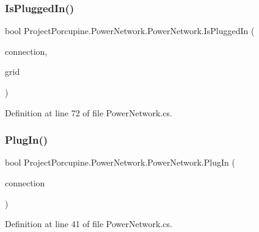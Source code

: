 \subsubsection{\texorpdfstring{Is\+Plugged\+In()}{IsPluggedIn()}}
{\footnotesize\ttfamily bool Project\+Porcupine.\+Power\+Network.\+Power\+Network.\+Is\+Plugged\+In (\begin{DoxyParamCaption}\item[{\hyperlink{interface_project_porcupine_1_1_power_network_1_1_i_pluggable}{I\+Pluggable}}]{connection,  }\item[{out \hyperlink{class_project_porcupine_1_1_power_network_1_1_grid}{Grid}}]{grid }\end{DoxyParamCaption})}



Definition at line 72 of file Power\+Network.\+cs.

\mbox{\label{class_project_porcupine_1_1_power_network_1_1_power_network_ab6ca33ff4075cd8754bb7597454a9b5c}} 
\subsubsection{\texorpdfstring{Plug\+In()}{PlugIn()}\hspace{0.1cm}{\footnotesize\ttfamily [1/2]}}
{\footnotesize\ttfamily bool Project\+Porcupine.\+Power\+Network.\+Power\+Network.\+Plug\+In (\begin{DoxyParamCaption}\item[{\hyperlink{interface_project_porcupine_1_1_power_network_1_1_i_pluggable}{I\+Pluggable}}]{connection }\end{DoxyParamCaption})}



Definition at line 41 of file Power\+Network.\+cs.

\mbox{\label{class_project_porcupine_1_1_power_network_1_1_power_network_a95477cc53da485b6afc4243ae9313d6c}} 
